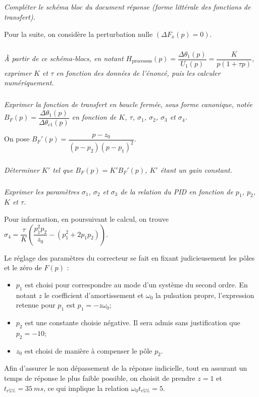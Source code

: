 \subparagraph{}
\textit{Compléter le schéma bloc du document réponse (forme littérale des fonctions de transfert).}
\ifprof
\begin{corrige}
\end{corrige}
\else
\fi


Pour la suite, on considère la perturbation nulle $\left(\Delta F_x(p)=0\right)$.

\subparagraph{}
\textit{À partir de ce schéma-blocs, en notant $H_{\text{processus}}(p)=\dfrac{\Delta \theta_1(p)}{U_1(p)}=\dfrac{K}{p\left(1+\tau p \right)}$, exprimer $K$ et $\tau$ en fonction des données de l'énoncé, puis les calculer numériquement.}
\ifprof
\begin{corrige}
\end{corrige}
\else
\fi


\subparagraph{}
\textit{Exprimer la fonction de transfert en boucle fermée, sous forme canonique, notée $B_F(p)=\dfrac{\Delta \theta_1(p)}{\Delta \theta_{c1}(p)}$ en fonction de $K$, $\tau$, $\sigma_1$, $\sigma_2$, $\sigma_3$ et  $\sigma_4$.}
\ifprof
\begin{corrige}
\end{corrige}
\else
\fi

On pose $B_F'(p)=\dfrac{p-z_0}{\left(p-p_2 \right)\left( p-p_1\right)^2}$.



\subparagraph{}
\textit{Déterminer $K'$ tel que $B_F(p)=K'B_F'(p)$, $K'$ étant un gain constant.}
\ifprof
\begin{corrige}
\end{corrige}
\else
\fi


\subparagraph{}
\textit{Exprimer les paramètres $\sigma_1$, $\sigma_2$ et $\sigma_3$ de la relation du PID en fonction de $p_1$, $p_2$, $K$ et $\tau$.}
\ifprof
\begin{corrige}
\end{corrige}
\else
\fi


Pour information, en poursuivant le calcul, on trouve $\sigma_4 = \dfrac{\tau }{K}\left( \dfrac{p_1^2 p_2}{z_0} -\left(p_1^2 + 2p_1 p_2 \right)\right)$.

Le réglage des paramètres du correcteur se fait en fixant judicieusement les pôles et le zéro de $F(p)$ :
\begin{itemize}
\item $p_1$ est choisi pour correspondre au mode d’un système du second ordre. En notant $z$ le coefficient d’amortissement et $\omega_0$ la pulsation propre, l’expression retenue pour $p_1$ est $p_1=-z\omega_0$; 
\item $p_2$ est une constante choisie négative. Il sera admis sans justification que $p_2=-10$;
\item $z_0$ est choisi de manière à compenser le pôle $p_2$.
\end{itemize}
Afin d’assurer le non dépassement de la réponse indicielle, tout en assurant un temps de réponse le plus faible
possible, on choisit de prendre $z=1$ et $t_{r5\%}=\SI{35}{ms}$,  ce qui implique la relation
$\omega_0 t_{r5\%}=5$.

